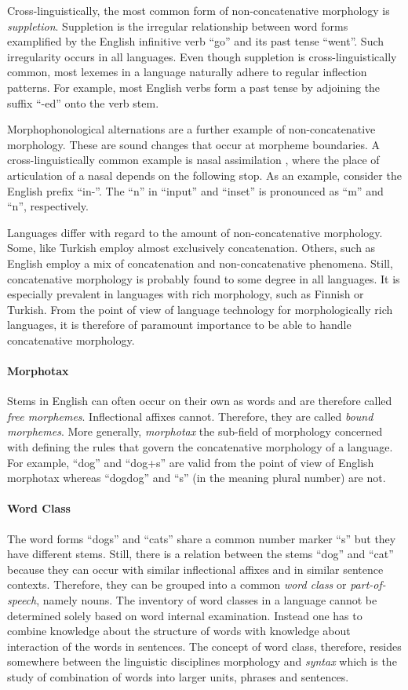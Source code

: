 Cross-linguistically, the most common form of non-concatenative
morphology is {\it suppletion}. Suppletion is the irregular
relationship between word forms examplified by the English infinitive
verb ``go'' and its past tense ``went''. Such irregularity occurs in
all languages. Even though suppletion is cross-linguistically common,
most lexemes in a language naturally adhere to regular inflection
patterns. For example, most English verbs form a past tense by
adjoining the suffix ``-ed'' onto the verb stem.

Morphophonological alternations are a further example of
non-concatenative morphology. These are sound changes that occur at
morpheme boundaries. A cross-linguistically common example is nasal
assimilation \citep[p. 29]{Carr1993}, where the place of articulation
of a nasal depends on the following stop. As an example, consider the
English prefix ``in-''. The ``n'' in ``input'' and ``inset'' is
pronounced as ``m'' and ``n'', respectively.

Languages differ with regard to the amount of non-concatenative
morphology. Some, like Turkish employ almost exclusively
concatenation.  Others, such as English employ a mix of concatenation
and non-concatenative phenomena. Still, concatenative morphology is
probably found to some degree in all languages. It is especially
prevalent in languages with rich morphology, such as Finnish or
Turkish. From the point of view of language technology for
morphologically rich languages, it is therefore of paramount
importance to be able to handle concatenative morphology.

\paragraph{Morphotax} Stems in English can often occur on their own as
words and are therefore called {\it free morphemes}. Inflectional
affixes cannot. Therefore, they are called {\it bound morphemes}. More
generally, {\it morphotax} the sub-field of morphology concerned with
defining the rules that govern the concatenative morphology of a
language. For example, ``dog'' and ``dog+s'' are valid from the point
of view of English morphotax whereas ``dogdog'' and ``s'' (in the
meaning plural number) are not.

\paragraph{Word Class} The word forms ``dogs'' and ``cats'' share a
common number marker ``s'' but they have different stems. Still, there
is a relation between the stems ``dog'' and ``cat'' because they can
occur with similar inflectional affixes and in similar sentence
contexts. Therefore, they can be grouped into a common {\it word
  class} or {\it part-of-speech}, namely nouns.  The inventory of word
classes in a language cannot be determined solely based on word
internal examination. Instead one has to combine knowledge about the
structure of words with knowledge about interaction of the words in
sentences. The concept of word class, therefore, resides somewhere
between the linguistic disciplines morphology and {\it syntax} which
is the study of combination of words into larger units, phrases and
sentences.

